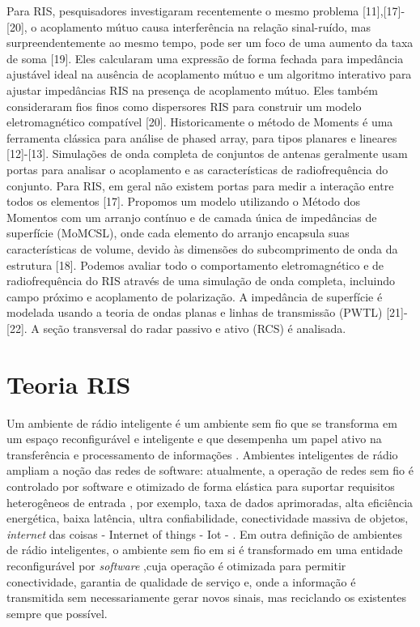 \documentclass[
	12pt,				%
	openright,			%
	oneside,			%
	a4paper,			%
	english,			%
	brazil				%
	]{abntex2}
\begin{document}
Para RIS, pesquisadores investigaram recentemente o mesmo problema [11],[17]-[20], o acoplamento mútuo causa interferência na relação sinal-ruído, mas surpreendentemente ao mesmo tempo, pode ser um foco de uma aumento da taxa de soma [19]. Eles calcularam uma expressão de forma fechada para impedância ajustável ideal na ausência de acoplamento mútuo e um algoritmo interativo para ajustar impedâncias RIS na presença de acoplamento mútuo. Eles também consideraram fios finos como dispersores RIS para construir um modelo eletromagnético compatível [20].
Historicamente o método de Moments é uma ferramenta clássica para análise de phased array, para tipos planares e lineares [12]-[13]. Simulações de onda completa de conjuntos de antenas geralmente usam portas para analisar o acoplamento e as características de radiofrequência do conjunto. Para RIS, em geral não existem portas para medir a interação entre todos os elementos [17]. Propomos um modelo utilizando o Método dos Momentos com um arranjo contínuo e de camada única de impedâncias de superfície (MoMCSL), onde cada elemento do arranjo encapsula suas características de volume, devido às dimensões do subcomprimento de onda da estrutura [18]. Podemos avaliar todo o comportamento eletromagnético e de radiofrequência do RIS através de uma simulação de onda completa, incluindo campo próximo e acoplamento de polarização. A impedância de superfície é modelada usando a teoria de ondas planas e linhas de transmissão (PWTL) [21]-[22]. A seção transversal do radar passivo e ativo (RCS) é analisada.


\chapter{Teoria RIS}
Um ambiente de rádio inteligente é um ambiente sem fio que se transforma em um espaço reconfigurável e inteligente e que desempenha um papel ativo na transferência e processamento de informações \cite{ProgrammableEnvironment}. Ambientes inteligentes de rádio ampliam a noção das redes de software: atualmente, a operação de redes sem fio é controlado por software e otimizado de forma elástica para suportar requisitos heterogêneos de entrada , por exemplo, taxa de dados aprimoradas, alta eficiência energética, baixa latência, ultra confiabilidade, conectividade massiva de objetos, \textit{internet} das coisas - Internet of things - Iot - \cite{5GPPP} . Em outra definição de ambientes de rádio inteligentes, o ambiente sem fio em si é transformado em uma entidade reconfigurável por \textit{software} \cite{WirellessCTRIS},cuja operação é otimizada para permitir conectividade, garantia de qualidade de serviço e, onde a informação é transmitida sem necessariamente gerar novos sinais, mas reciclando os existentes sempre que possível.
\end{document}
